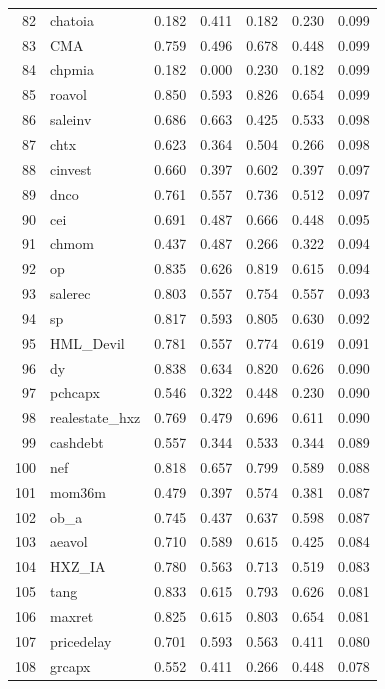 \documentclass[12pt]{article}
\begin{document}
\begin{footnotesize}
\begin{longtable}{rl|c|c|c|c|c}
		82 & chatoia & 0.182 & 0.411 & 0.182 & 0.230 & 0.099 \\ 
		83 & CMA & 0.759 & 0.496 & 0.678 & 0.448 & 0.099 \\ 
		84 & chpmia & 0.182 & 0.000 & 0.230 & 0.182 & 0.099 \\ 
		85 & roavol & 0.850 & 0.593 & 0.826 & 0.654 & 0.099 \\ 
		86 & saleinv & 0.686 & 0.663 & 0.425 & 0.533 & 0.098 \\ 
		87 & chtx & 0.623 & 0.364 & 0.504 & 0.266 & 0.098 \\ 
		88 & cinvest & 0.660 & 0.397 & 0.602 & 0.397 & 0.097 \\ 
		89 & dnco & 0.761 & 0.557 & 0.736 & 0.512 & 0.097 \\ 
		90 & cei & 0.691 & 0.487 & 0.666 & 0.448 & 0.095 \\ 
		91 & chmom & 0.437 & 0.487 & 0.266 & 0.322 & 0.094 \\ 
		92 & op & 0.835 & 0.626 & 0.819 & 0.615 & 0.094 \\ 
		93 & salerec & 0.803 & 0.557 & 0.754 & 0.557 & 0.093 \\ 
		94 & sp & 0.817 & 0.593 & 0.805 & 0.630 & 0.092 \\ 
		95 & HML\_Devil & 0.781 & 0.557 & 0.774 & 0.619 & 0.091 \\ 
		96 & dy & 0.838 & 0.634 & 0.820 & 0.626 & 0.090 \\ 
		97 & pchcapx & 0.546 & 0.322 & 0.448 & 0.230 & 0.090 \\ 
		98 & realestate\_hxz & 0.769 & 0.479 & 0.696 & 0.611 & 0.090 \\ 
		99 & cashdebt & 0.557 & 0.344 & 0.533 & 0.344 & 0.089 \\ 
		100 & nef & 0.818 & 0.657 & 0.799 & 0.589 & 0.088 \\ 
		101 & mom36m & 0.479 & 0.397 & 0.574 & 0.381 & 0.087 \\ 
		102 & ob\_a & 0.745 & 0.437 & 0.637 & 0.598 & 0.087 \\ 
		103 & aeavol & 0.710 & 0.589 & 0.615 & 0.425 & 0.084 \\ 
		104 & HXZ\_IA & 0.780 & 0.563 & 0.713 & 0.519 & 0.083 \\ 
		105 & tang & 0.833 & 0.615 & 0.793 & 0.626 & 0.081 \\ 
		106 & maxret & 0.825 & 0.615 & 0.803 & 0.654 & 0.081 \\ 
		107 & pricedelay & 0.701 & 0.593 & 0.563 & 0.411 & 0.080 \\ 
		108 & grcapx & 0.552 & 0.411 & 0.266 & 0.448 & 0.078 \\ 

\end{longtable}
\end{footnotesize}
\end{document}
